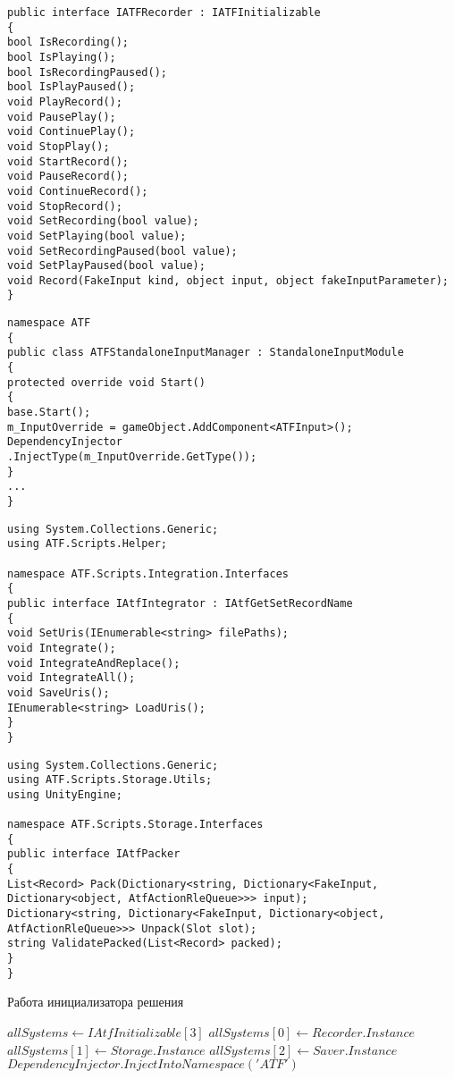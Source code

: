 \begin{lstlisting}[caption={Интерфейc модуля записи},label=iRecorder]
public interface IATFRecorder : IATFInitializable
{
bool IsRecording();
bool IsPlaying();
bool IsRecordingPaused();
bool IsPlayPaused();
void PlayRecord();
void PausePlay();
void ContinuePlay();
void StopPlay();
void StartRecord();
void PauseRecord();
void ContinueRecord();
void StopRecord();
void SetRecording(bool value);
void SetPlaying(bool value);
void SetRecordingPaused(bool value);
void SetPlayPaused(bool value);
void Record(FakeInput kind, object input, object fakeInputParameter);
}
\end{lstlisting}

\begin{lstlisting}[caption={Пользовательский модуль ввода для ATFInput},label=inputModule]
namespace ATF
{
public class ATFStandaloneInputManager : StandaloneInputModule
{
protected override void Start()
{
base.Start();
m_InputOverride = gameObject.AddComponent<ATFInput>();
DependencyInjector
.InjectType(m_InputOverride.GetType());
}
...
}
\end{lstlisting}

\begin{lstlisting}[caption={Интерфейс модуля интеграции в готовую кодовую базу},label=iIntegrator]
using System.Collections.Generic;
using ATF.Scripts.Helper;

namespace ATF.Scripts.Integration.Interfaces
{
public interface IAtfIntegrator : IAtfGetSetRecordName
{
void SetUris(IEnumerable<string> filePaths);
void Integrate();
void IntegrateAndReplace();
void IntegrateAll();
void SaveUris();
IEnumerable<string> LoadUris();
}
}
\end{lstlisting}

\begin{lstlisting}[caption={Интерфейс модуля упаковки хранилища данных},label=iPacker]
using System.Collections.Generic;
using ATF.Scripts.Storage.Utils;
using UnityEngine;

namespace ATF.Scripts.Storage.Interfaces
{
public interface IAtfPacker
{
List<Record> Pack(Dictionary<string, Dictionary<FakeInput, Dictionary<object, AtfActionRleQueue>>> input);
Dictionary<string, Dictionary<FakeInput, Dictionary<object, AtfActionRleQueue>>> Unpack(Slot slot);
string ValidatePacked(List<Record> packed);
}
}
\end{lstlisting}

\begin{algorithm}
	\caption{Работа инициализатора решения}\label{alg:initializer}
	\begin{algorithmic}
		\State $allSystems \gets IAtfInitializable[3]$
		\State $allSystems[0] \gets Recorder.Instance$
		\State $allSystems[1] \gets Storage.Instance$
		\State $allSystems[2] \gets Saver.Instance$
		  \EndFor
		\State $DependencyInjector.InjectIntoNamespace('ATF')$
	\end{algorithmic}
\end{algorithm}

